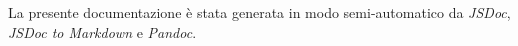 La presente documentazione è stata generata in modo semi-automatico da \emph{JSDoc}, \emph{JSDoc to Markdown} e \emph{Pandoc}.

